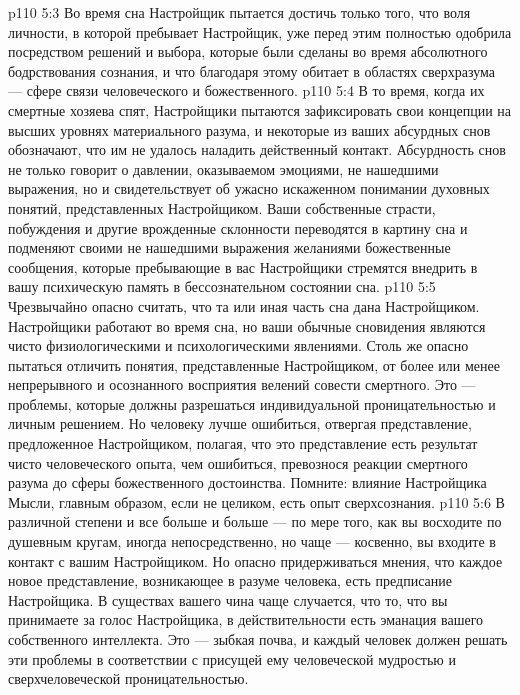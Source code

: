 \vs p110 5:3 Во время сна Настройщик пытается достичь только того, что воля личности, в которой пребывает Настройщик, уже перед этим полностью одобрила посредством решений и выбора, которые были сделаны во время абсолютного бодрствования сознания, и что благодаря этому обитает в областях сверхразума --- сфере связи человеческого и божественного.
\vs p110 5:4 В то время, когда их смертные хозяева спят, Настройщики пытаются зафиксировать свои концепции на высших уровнях материального разума, и некоторые из ваших абсурдных снов обозначают, что им не удалось наладить действенный контакт. Абсурдность снов не только говорит о давлении, оказываемом эмоциями, не нашедшими выражения, но и свидетельствует об ужасно искаженном понимании духовных понятий, представленных Настройщиком. Ваши собственные страсти, побуждения и другие врожденные склонности переводятся в картину сна и подменяют своими не нашедшими выражения желаниями божественные сообщения, которые пребывающие в вас Настройщики стремятся внедрить в вашу психическую память в бессознательном состоянии сна.
\vs p110 5:5 Чрезвычайно опасно считать, что та или иная часть сна дана Настройщиком. Настройщики работают во время сна, но ваши обычные сновидения являются чисто физиологическими и психологическими явлениями. Столь же опасно пытаться отличить понятия, представленные Настройщиком, от более или менее непрерывного и осознанного восприятия велений совести смертного. Это --- проблемы, которые должны разрешаться индивидуальной проницательностью и личным решением. Но человеку лучше ошибиться, отвергая представление, предложенное Настройщиком, полагая, что это представление есть результат чисто человеческого опыта, чем ошибиться, превознося реакции смертного разума до сферы божественного достоинства. Помните: влияние Настройщика Мысли, главным образом, если не целиком, есть опыт сверхсознания.
\vs p110 5:6 В различной степени и все больше и больше --- по мере того, как вы восходите по душевным кругам, иногда непосредственно, но чаще --- косвенно, вы входите в контакт с вашим Настройщиком. Но опасно придерживаться мнения, что каждое новое представление, возникающее в разуме человека, есть предписание Настройщика. В существах вашего чина чаще случается, что то, что вы принимаете за голос Настройщика, в действительности есть эманация вашего собственного интеллекта. Это --- зыбкая почва, и каждый человек должен решать эти проблемы в соответствии с присущей ему человеческой мудростью и сверхчеловеческой проницательностью.
